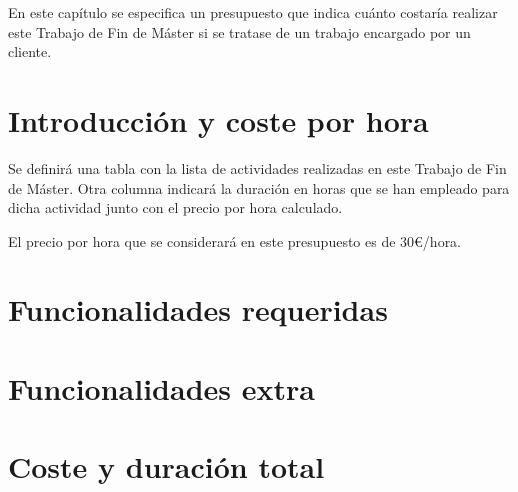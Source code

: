 

En este capítulo se especifica un presupuesto que indica cuánto costaría realizar este Trabajo de Fin de Máster
si se tratase de un trabajo encargado por un cliente.

\section{Introducción y coste por hora}
\label{6:sec:1}

Se definirá una tabla con la lista de actividades realizadas en este Trabajo de Fin de Máster. Otra columna indicará la duración en horas que se han empleado para dicha actividad junto con el precio por hora calculado.
\bigskip

El precio por hora que se considerará en este presupuesto es de 30\euro{}/hora.
\newpage
    
\section{Funcionalidades requeridas}
\label{6:sec:2}



\section{Funcionalidades extra}
\label{6:sec:3}


\newpage
\section{Coste y duración total}
\label{6:sec:4}


